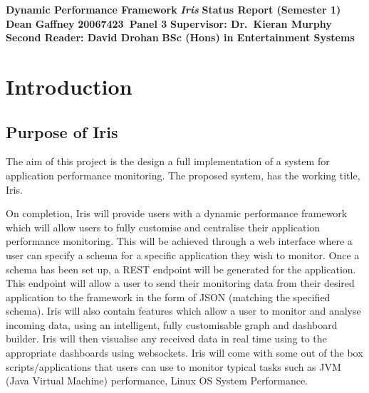 \documentclass[12pt,a4paper,titlepage]{report}
\newcommand\AcademicTitle{Dynamic Performance Framework}
\newcommand\CommericalTitle{Iris}
\newcommand\Author{Dean Gaffney}
\newcommand\StudentID{20067423}
\newcommand\Report{Status Report (Semester 1)}
\newcommand\Reader{Supervisor: Dr.~Kieran Murphy}
\newcommand\SecondReader{Second Reader: David Drohan}
\begin{document}

\thispagestyle{empty}
\begin{center}
\mbox{}\vfill
{\fontsize{18pt}{20pt}\selectfont \bfseries \AcademicTitle}
\vfill
{\fontsize{14pt}{20pt}\selectfont \bfseries\itshape \CommericalTitle}
\vfill
{\fontsize{12pt}{20pt}\selectfont \bfseries \Report}
\vfill
{\fontsize{14pt}{20pt}\selectfont \bfseries \Author}
\vfill
{\fontsize{14pt}{20pt}\selectfont \bfseries \StudentID\ Panel 3}
\vfill
{\fontsize{14pt}{20pt}\selectfont \bfseries \Reader}
\vfill
{\fontsize{14pt}{20pt}\selectfont \bfseries \SecondReader}
\vfill
{\fontsize{14pt}{20pt}\selectfont \bfseries BSc (Hons) in Entertainment Systems}
\vfill
\end{center}
\clearpage

\tableofcontents
\listoftables
\listoffigures

\clearpage
{}
\setcounter{page}{1}


\chapter{Introduction}

\section{Purpose of Iris}

The aim of this project is the design a full implementation of a system for application performance monitoring. The proposed system, has the working title,  Iris. 

On completion, Iris will provide users with a dynamic performance framework which will allow users to fully customise and centralise their application performance monitoring. This will be achieved through a web interface where a user can specify a schema for a specific application they wish to monitor. Once a schema has been set up, a REST endpoint will be generated for the application. This endpoint will allow a user to send their monitoring data from their desired application to the framework in the form of JSON (matching the specified schema). Iris will also contain features which allow a user to monitor and analyse incoming data, using an intelligent, fully customisable graph and dashboard builder. Iris will then visualise any received data in real time using to the appropriate dashboards using websockets. Iris will come with some out of the box scripts/applications that users can use to monitor typical tasks such as JVM (Java Virtual Machine) performance, Linux OS System Performance.
\end{document}
